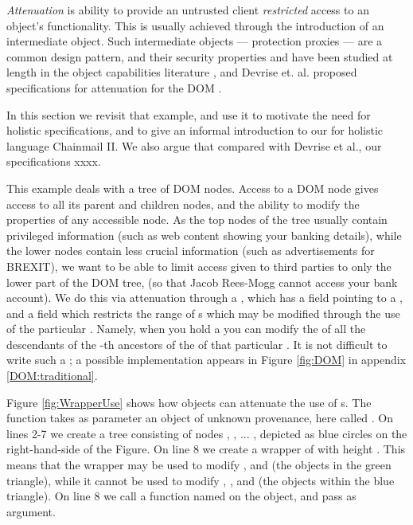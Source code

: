 \emph{Attenuation} is ability to provide an untrusted client \emph{restricted}  access to an object's functionality. This is usually achieved through the introduction of an intermediate object. Such intermediate objects --- protection proxies \cite{gof} --- are a common design pattern, and their security properties and have been studied at length in the object capabilities literature \cite{millerPhD,murray10-infoflow}, and 
Devrise et. al. proposed specifications for attenuation for the DOM \cite{dd}.

In this section we revisit that example, and use it to motivate the
need for holistic specifications, and to give an informal introduction
to our for holistic  language Chainmail II. We also argue that
compared with Devrise et al., our specifications xxxx.

This example deals with a tree of DOM nodes. Access to a DOM node
gives access to all its parent and children nodes, and the ability to
modify the properties of any accessible node. As the top nodes of the
tree usually contain privileged information (such as web content
showing your banking details), while the lower nodes contain less
crucial information (such as advertisements for BREXIT), we want to be
able to limit access given to third parties to only the lower part of
the DOM tree, (so that Jacob Rees-Mogg cannot access your bank
account). We do this via attenuation through a , which has
a field  pointing to a , and a field 
which restricts the range of s which may be modified through
the use of the particular . Namely, when you hold
a  you can modify the  of all the
descendants of the -th ancestors of the  of that
particular .  It is not difficult to write such
a ; a possible implementation appears in
Figure \ref{fig:DOM} in appendix \ref{DOM:traditional}.


Figure \ref{fig:WrapperUse} shows how  
 objects can  attenuate the use of 
s.
The
function  takes as parameter an object of unknown
provenance, here called . On lines 2-7 we create a tree
consisting of nodes , , ... , depicted as blue
circles on the right-hand-side of the Figure. On line 8 we create a
wrapper of  with height . This means that the
wrapper  may be used to modify ,  and 
(\ie the objects in the green triangle), while it cannot be used to
modify , , and  (\ie the objects within the
blue triangle).  On line 8 we call a function named  on
the  object, and pass  as argument.

